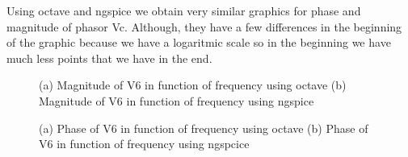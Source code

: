 Using octave and ngspice we obtain very similar graphics for phase and magnitude of phasor Vc. Although, they have a few differences in the beginning of the graphic because we have a logaritmic scale
so in the beginning we have much less points that we have in the end.

\newpage

\begin{figure}[h!]
            \centering
            \caption{(a) Magnitude of V6 in function of frequency using octave (b) Magnitude of V6 in function of frequency using ngspice}
            \label{fig:icase}
\end{figure}
\begin{figure}[h!]
            \centering
            \caption{(a) Phase of V6 in function of frequency using octave (b) Phase of V6 in function of frequency using ngspcice}
            \label{fig:icere}
\end{figure}


